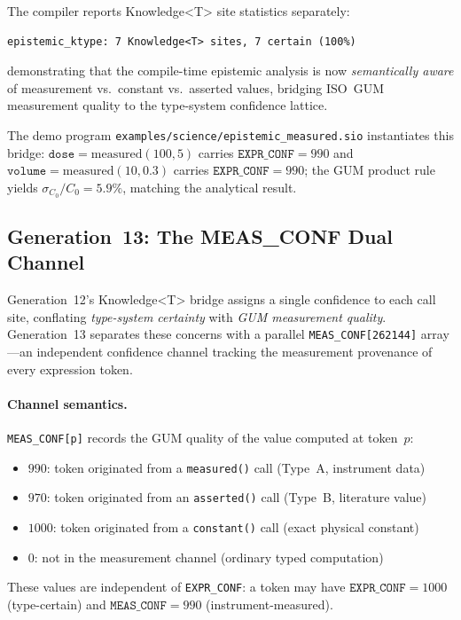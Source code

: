 \documentclass[acmsmall,screen,review,anonymous]{acmart}
\begin{document}
The compiler reports Knowledge\textless T\textgreater{} site statistics separately:
\begin{verbatim}
epistemic_ktype: 7 Knowledge<T> sites, 7 certain (100%)
\end{verbatim}
demonstrating that the compile-time epistemic analysis is now
\emph{semantically aware} of measurement vs.\ constant vs.\ asserted values,
bridging ISO~GUM measurement quality to the type-system confidence lattice.

The demo program \texttt{examples/science/epistemic\_measured.sio} instantiates
this bridge: $\texttt{dose} = \text{measured}(100, 5)$ carries
$\texttt{EXPR\_CONF} = 990$ and $\texttt{volume} = \text{measured}(10, 0.3)$
carries $\texttt{EXPR\_CONF} = 990$; the GUM product rule yields
$\sigma_{C_0} / C_0 = 5.9\%$, matching the analytical result.

\subsection{Generation~13: The MEAS\_CONF Dual Channel}
\label{sec:gen13}

Generation~12's Knowledge\textless T\textgreater{} bridge assigns a single confidence to
each call site, conflating \emph{type-system certainty} with \emph{GUM
measurement quality}.
Generation~13 separates these concerns with a parallel \texttt{MEAS\_CONF[262144]}
array---an independent confidence channel tracking the measurement provenance of
every expression token.

\paragraph{Channel semantics.}
\texttt{MEAS\_CONF[p]} records the GUM quality of the value computed at token~$p$:
\begin{itemize}
  \item $990$: token originated from a \texttt{measured()} call (Type~A, instrument data)
  \item $970$: token originated from an \texttt{asserted()} call (Type~B, literature value)
  \item $1000$: token originated from a \texttt{constant()} call (exact physical constant)
  \item $0$: not in the measurement channel (ordinary typed computation)
\end{itemize}
These values are independent of \texttt{EXPR\_CONF}: a token may have
$\texttt{EXPR\_CONF} = 1000$ (type-certain) and $\texttt{MEAS\_CONF} = 990$
(instrument-measured).
\end{document}
